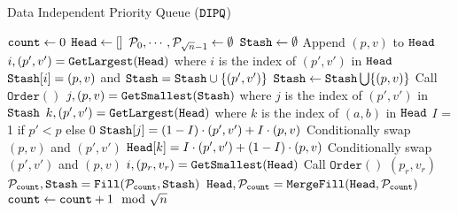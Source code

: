 	
\begin{algorithm}
	\caption{Data Independent Priority Queue ($\texttt{DIPQ}$)}
	\label{alg:DIQueue}
	\begin{algorithmic}[1]
		\Function{$\DIPQInit$}{}
		\State ${\texttt{count}} \gets 0$
		\State $\texttt{Head} \gets []$
		\State $\mathcal{P}_0, \cdots, \mathcal{P}_{{\sqrt{n}}-1} \gets \emptyset$
		\State $\texttt{Stash} \gets \emptyset$
		\EndFunction
		\If{$|\DIPQhead| < \sqrtn$}
			\State Append $(p, v)$ to $\texttt{Head}$
		\Else
			\State $i, (p', v') = \texttt{GetLargest}(\texttt{Head})$ where $i$ is the index of $(p', v')$ in $\texttt{Head}$
			\label{algline:HeadExtract}
				\State $\texttt{Stash}[i] = (p, v)$ and $\texttt{Stash} = \texttt{Stash} \cup \{(p', v')\}$
			\Else
				\State $\texttt{Stash} \gets \texttt{Stash} \bigcup \{(p, v)\}$
			\EndIf
		\EndIf
		\State Call $\texttt{Order}()$ \label{algline:PQOrderIns}
		\EndFunction
		\Function{$\DIPQExtract$}{}
		 	\State $j, (p, v) = \texttt{GetSmallest}(\texttt{Stash})$ where $j$ is the index of $(p', v')$ in $\texttt{Stash}$
		 	\State $k, (p', v') = \texttt{GetLargest}(\texttt{Head})$ where $k$ is the index of $(a, b)$ in $\texttt{Head}$
			\State $I$ = 1 if $p' < p$ else 0
			\State $\texttt{Stash}[j] = (1 - I) \cdot (p', v') + I \cdot (p, v)$ \Comment Conditionally swap $(p, v)$ and $(p', v')$
			\State $\texttt{Head}[k] = I \cdot (p', v') + (1 - I) \cdot (p, v)$ \Comment Conditionally swap $(p', v')$ and $(p, v)$
			\State $i, (p_r, v_r) = \texttt{GetSmallest}(\texttt{Head})$
			\State Call $\texttt{Order}()$
			\State \Return $(p_r, v_r)$
		\EndFunction
		\Function{$\DIPQOrder$}{}
			\State $\mathcal{P}_{{\texttt{count}}}, \texttt{Stash} = \texttt{Fill}(\mathcal{P}_{\texttt{count}}, \texttt{Stash})$
			\State $\texttt{Head}, \mathcal{P}_{\texttt{count}} = \texttt{MergeFill}(\texttt{Head}, \mathcal{P}_{\texttt{count}})$
			\State ${\texttt{count}} \gets {\texttt{count}} + 1 \mod {{\sqrt{n}}}$
		\EndFunction
	\end{algorithmic}
\end{algorithm}



